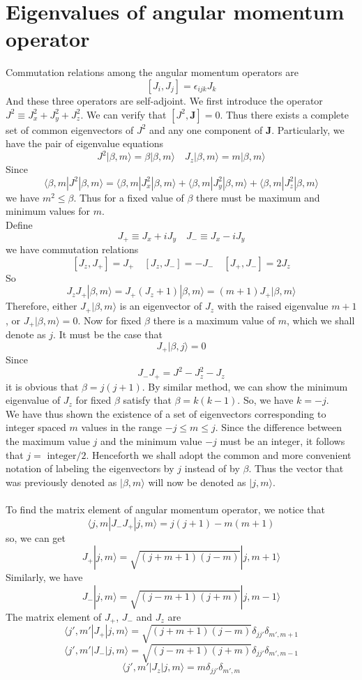 \section{Eigenvalues of angular momentum operator}
Commutation relations among the angular momentum operators are
\[[J_i,J_j] = \epsilon_{ijk} J_k\]
And these three operators are self-adjoint. We first introduce the operator $J^2 \equiv J_x^2 + J_y^2 + J_z^2$. We can verify that $[J^2,\bm{J}] = 0$. Thus there exists a complete set of common eigenvectors of $J^2$ and any one component of $\bm{J}$. Particularly, we have the pair of eigenvalue equations
\[J^2 | \beta,m\rangle = \beta | \beta,m\rangle \quad J_z | \beta,m\rangle = m | \beta,m\rangle\]
Since
\[\langle \beta,m | J^2 | \beta,m \rangle = \langle \beta,m | J_x^2 | \beta,m \rangle + \langle \beta,m | J_y^2 | \beta,m \rangle + \langle \beta,m | J_z^2 | \beta,m \rangle\]
we have $m^2 \leq \beta$. Thus for a fixed value of $\beta$ there must be maximum and minimum values for $m$.\\
Define
\[J_+ \equiv J_x + iJ_y \quad J_- \equiv J_x - iJ_y\]
we have commutation relations
\[[J_z,J_+] = J_+ \quad [J_z,J_-] = -J_- \quad [J_+,J_-] = 2J_z\]
So
\[J_z J_+ | \beta,m\rangle = J_+(J_z + 1)| \beta,m\rangle = (m+1)J_+| \beta,m\rangle\]
Therefore, either $J_+ | \beta,m\rangle$ is an eigenvector of $J_z$ with the raised eigenvalue $m+1$, or $J_+ | \beta,m\rangle = 0$. Now for fixed $\beta$ there is a maximum value of $m$, which we shall denote as $j$. It must be the case that
\[J_+ |\beta,j\rangle = 0\]
Since
\[J_- J_+ = J^2 - J_z^2 - J_z\]
it is obvious that $\beta = j(j+1)$. By similar method, we can show the minimum eigenvalue of $J_z$ for fixed $\beta$ satisfy that $\beta = k(k-1)$. So, we have $k = -j$. \\
We have thus shown the existence of a set of eigenvectors corresponding to integer spaced $m$ values in the range $-j \leq m \leq j$. Since the difference between the maximum value $j$ and the minimum value $-j$ must be an integer, it follows that $j = \mbox{ integer} / 2$. Henceforth we shall adopt the common and more convenient notation of labeling the eigenvectors by $j$ instead of by $\beta$. Thus the vector that was previously denoted as $|\beta,m\rangle$ will now be denoted as $|j,m\rangle$. 
\\ \\
To find the matrix element of angular momentum operator, we notice that
\[\langle j,m| J_-J_+|j,m\rangle = j(j+1)-m(m+1)\]
so, we can get
\[J_+ |j,m\rangle = \sqrt{(j+m+1)(j-m)} |j,m+1\rangle\]
Similarly, we have
\[J_- |j,m\rangle = \sqrt{(j-m+1)(j+m)} |j,m-1\rangle\]
The matrix element of $J_+$, $J_-$ and $J_z$ are
\[\langle j',m'| J_+ | j,m\rangle = \sqrt{(j+m+1)(j-m)} \delta_{jj'}\delta_{m',m+1}\]
\[\langle j',m'| J_- | j,m\rangle = \sqrt{(j-m+1)(j+m)} \delta_{jj'}\delta_{m',m-1}\]
\[\langle j',m'| J_z | j,m\rangle = m \delta_{jj'}\delta_{m',m}\]

